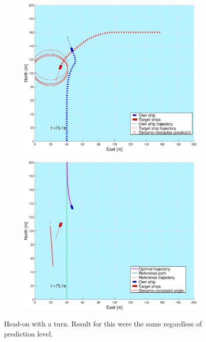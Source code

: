 \begin{figure}[ht!]
\begin{subfigure}[b]{0.494\textwidth}
        \subcaption{}
    \end{subfigure}
    \hfill
    \\
    \begin{subfigure}[b]{0.494\textwidth}
        \centering
        \includegraphics[width=\textwidth]{Images/Figures/sving_HO/_Simple_0fig1_time=75}
        \subcaption{}
    \end{subfigure}
    \hfill
    \begin{subfigure}[b]{0.494\textwidth}
        \centering
        \includegraphics[width=\textwidth]{Images/Figures/sving_HO/_Simple_0fig999_time=75}
        \subcaption{}
    \end{subfigure}
    \hfill
    \caption{Head-on with a turn. Result for this were the same regardless of prediction level.}
    \label{FIG: Turn HO}
\end{figure}%
